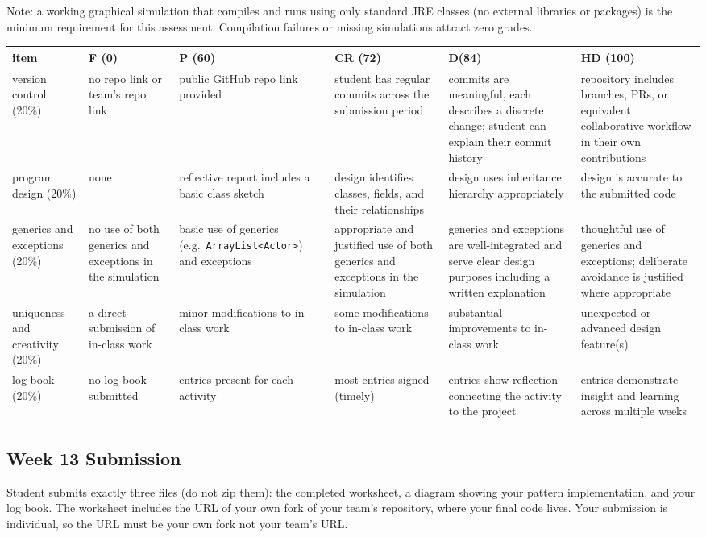 \documentclass[twoside=false,DIV=14]{scrartcl}
\begin{document}
Note: a working graphical simulation that compiles and runs using only standard JRE classes (no external libraries or packages) is the minimum requirement for this assessment.  Compilation failures or missing simulations attract zero grades.

\begin{tabular}{@{}p{}|p{}p{}p{}p{}p{}@{}}
\hline
item & F (0) & P (60) & CR (72) & D(84) & HD (100)\\
\hline \hline
version control (20\%) &
no repo link or team's repo link &
public GitHub repo link provided &
student has regular commits across the submission period &
commits are meaningful, each describes a discrete change;
student can explain their commit history &
repository includes branches, PRs, or equivalent
collaborative workflow in their own contributions\\
\hline
program design (20\%) &
none &
reflective report includes a basic class sketch &
design identifies classes, fields, and their relationships &
design uses inheritance hierarchy appropriately &
design is accurate to the submitted code\\
\hline
generics and exceptions (20\%) &
no use of both generics and exceptions in the simulation &
basic use of generics (e.g.\ \texttt{ArrayList<Actor>}) and exceptions &
appropriate and justified use of both generics and exceptions in the simulation &
generics and exceptions are well-integrated and serve clear design purposes including a written explanation &
thoughtful use of generics and exceptions; deliberate avoidance is justified where appropriate\\
\hline
uniqueness and creativity (20\%) &
a direct submission of in-class work &
minor modifications to in-class work &
some modifications to in-class work &
substantial improvements to in-class work &
unexpected or advanced design feature(s) \\ 
\hline
log book (20\%) &
no log book submitted &
entries present for each activity &
most entries signed (timely) &
entries show reflection connecting the activity to the project &
entries demonstrate insight and learning across multiple weeks\\
\hline
\end{tabular}

\subsection*{Week 13 Submission}
Student submits exactly three files (do not zip them): the completed worksheet, a diagram showing your pattern implementation, and your log book.  The worksheet includes the URL of your own fork of your team's repository, where your final code lives.  Your submission is individual, so the URL must be your own fork not your team's URL.
\end{document}
